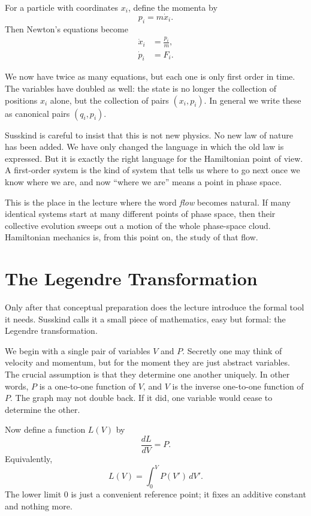 For a particle with coordinates \(x_i\), define the momenta by
\begin{equation}
p_i = m \dot x_i .
\end{equation}
Then Newton's equations become
\begin{align}
\dot x_i &= \frac{p_i}{m}, \\
\dot p_i &= F_i .
\end{align}

We now have twice as many equations, but each one is only first order in time. The variables have doubled as well: the state is no longer the collection of positions \(x_i\) alone, but the collection of pairs \((x_i,p_i)\). In general we write these as canonical pairs \((q_i,p_i)\).

Susskind is careful to insist that this is not new physics. No new law of nature has been added. We have only changed the language in which the old law is expressed. But it is exactly the right language for the Hamiltonian point of view. A first-order system is the kind of system that tells us where to go next once we know where we are, and now ``where we are'' means a point in phase space.

This is the place in the lecture where the word \emph{flow} becomes natural. If many identical systems start at many different points of phase space, then their collective evolution sweeps out a motion of the whole phase-space cloud. Hamiltonian mechanics is, from this point on, the study of that flow.

\section{The Legendre Transformation}

Only after that conceptual preparation does the lecture introduce the formal tool it needs. Susskind calls it a small piece of mathematics, easy but formal: the Legendre transformation.

We begin with a single pair of variables \(V\) and \(P\). Secretly one may think of velocity and momentum, but for the moment they are just abstract variables. The crucial assumption is that they determine one another uniquely. In other words, \(P\) is a one-to-one function of \(V\), and \(V\) is the inverse one-to-one function of \(P\). The graph may not double back. If it did, one variable would cease to determine the other.

Now define a function \(L(V)\) by
\begin{equation}
\frac{dL}{dV}=P.
\end{equation}
Equivalently,
\begin{equation}
L(V)=\int_0^V P(V')\,dV'.
\end{equation}
The lower limit \(0\) is just a convenient reference point; it fixes an additive constant and nothing more.


